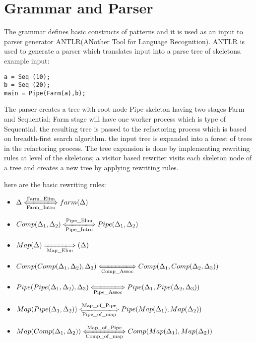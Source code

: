 \documentclass[12pt]{report}
\begin{document}
	
\title{}

\maketitle

\section{Grammar and Parser}
The grammar defines basic constructs of patterns and it is used as an input to parser generator ANTLR(ANother Tool for Language Recognition). ANTLR is used to generate a parser which translates input into a parse tree of skeletons. example input:

\begin{lstlisting}[style=refactor, caption={example input program},label={code1}]
a = Seq (10);
b = Seq (20);
main = Pipe(Farm(a),b);
\end{lstlisting}
The parser creates a tree with root node Pipe skeleton having two stages Farm and Sequential; Farm stage will have one worker process which is type of Sequential. the resulting tree is passed to the refactoring process which is based on  breadth-first search algorithm. the input tree is expanded into a forest of trees in the refactoring process. The tree expansion is done by implementing rewriting rules at level of the skeletons; a visitor based rewriter visits each skeleton node of a tree  and creates a new tree by applying rewriting rules. 

here are the basic rewriting rules:

\begin{itemize}
\item $\Delta \xLongleftrightarrow[\text{Farm\_Intro}]{\text{Farm\_Elim}} farm (\Delta)$\\
\item $Comp(\Delta_1, \Delta_2 )\xLongleftrightarrow[\text{Pipe\_Intro}]{\text{Pipe\_Elim}} Pipe (\Delta_1,\Delta_2)$\\
\item $Map(\Delta) \xLongrightarrow[\text{Map\_Elim}]{\text{}}  (\Delta)$\\
\item $Comp(Comp(\Delta_1, \Delta_2 ),\Delta_3)\xLongleftrightarrow[\text{Comp\_Assoc}]{\text{}} Comp (\Delta_1,Comp(\Delta_2,\Delta_3))$\\
\item $Pipe(Pipe(\Delta_1, \Delta_2 ),\Delta_3)\xLongleftrightarrow[\text{Pipe\_Assoc}]{\text{}} Pipe (\Delta_1,Pipe(\Delta_2,\Delta_3))$\\
\item $Map(Pipe(\Delta_1, \Delta_2 ))\xLongleftrightarrow[\text{Pipe\_of\_map}]{\text{Map\_of\_Pipe}} Pipe (Map(\Delta_1),Map(\Delta_2))$\\
\item $Map(Comp(\Delta_1, \Delta_2 ))\xLongleftrightarrow[\text{Comp\_of\_map}]{\text{Map\_of\_Pipe}} Comp (Map(\Delta_1),Map(\Delta_2))$\\
\end{itemize}
\end{document}
